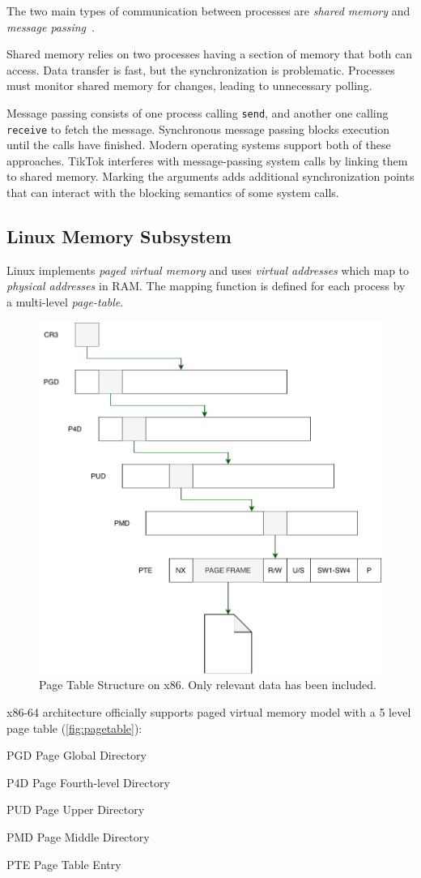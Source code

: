 \documentclass[conference]{IEEEtran}
\newcommand{\sysname}{TikTok}
\begin{document}
The two main types of communication between processes are \emph{shared memory} 
and \emph{message passing}~\cite{silberschatz2018operating}.

Shared memory relies on two processes having a section of memory that both can 
access. Data transfer is fast, but the synchronization is problematic. 
Processes must monitor shared memory for changes, leading to unnecessary
polling.

Message passing consists of one process calling \texttt{send}, and another one
calling \texttt{receive} to fetch the message. Synchronous message passing
blocks execution until the calls have finished.
Modern operating systems support both of these approaches. \sysname{} interferes
with message-passing system calls by linking them to shared memory. Marking the
arguments adds additional synchronization points that can interact with the
blocking semantics of some system calls.

\subsection{Linux Memory Subsystem}
\label{subsec:vm}

Linux implements \emph{paged virtual memory} and uses \emph{virtual addresses}
which map to \emph{physical addresses} in RAM. The mapping function is defined
for each process by a multi-level \emph{page-table}.

\begin{figure}[]
  \centering
  \includegraphics[width = .35 \textwidth]{img/pagetable.pdf}
  \caption{Page Table Structure on x86. Only relevant data has been included.}
  \label{fig:pagetable}
\end{figure}
x86-64 architecture officially supports paged virtual memory model with a 5 
level page table (\autoref{fig:pagetable}):
\begin{LaTeXdescription}
    \item[PGD] Page Global Directory
    \item[P4D] Page Fourth-level Directory
    \item[PUD] Page Upper Directory
    \item[PMD] Page Middle Directory
    \item[PTE] Page Table Entry
\end{LaTeXdescription}
\end{document}
